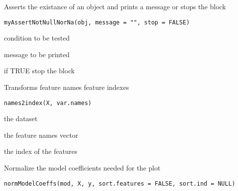 \documentclass[a4paper]{book}
\begin{document}
%
\begin{Description}
Asserts the existance of an object and prints a message or stops
the block
\end{Description}
%
\begin{Usage}
\begin{verbatim}
myAssertNotNullNorNa(obj, message = "", stop = FALSE)
\end{verbatim}
\end{Usage}
%
\begin{Arguments}
\begin{ldescription}
\item[\code{obj:}] condition to be tested

\item[\code{message:}] message to be printed

\item[\code{stop:}] if TRUE stop the block
\end{ldescription}
\end{Arguments}
%
\begin{Description}
Transforms feature names feature indexes
\end{Description}
%
\begin{Usage}
\begin{verbatim}
names2index(X, var.names)
\end{verbatim}
\end{Usage}
%
\begin{Arguments}
\begin{ldescription}
\item[\code{X:}] the dataset

\item[\code{var.names:}] the feature names vector
\end{ldescription}
\end{Arguments}
%
\begin{Value}
the index of the features
\end{Value}
%
\begin{Description}
Normalize the model coefficients needed for the plot
\end{Description}
%
\begin{Usage}
\begin{verbatim}
normModelCoeffs(mod, X, y, sort.features = FALSE, sort.ind = NULL)
\end{verbatim}
\end{Usage}
\end{document}
